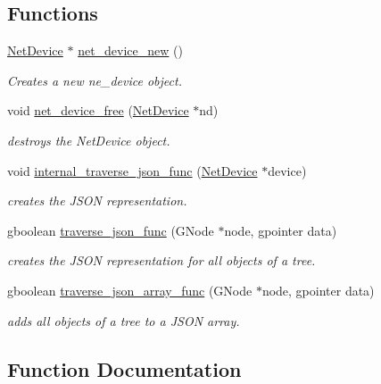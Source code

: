 \subsection*{Functions}
\begin{DoxyCompactItemize}
\item 
\hyperlink{gnode-object_8h_ab9c23d3a2ba4d9157b5ab053f61388dc}{Net\+Device} $\ast$ \hyperlink{gnode-object_8c_ae666b3f20895e60917e691c81d464235}{net\+\_\+device\+\_\+new} ()
\begin{DoxyCompactList}\small\item\em Creates a new ne\+\_\+device object. \end{DoxyCompactList}\item 
void \hyperlink{gnode-object_8c_af75477fcbe781bc0b17c75c1ad6d1606}{net\+\_\+device\+\_\+free} (\hyperlink{gnode-object_8h_ab9c23d3a2ba4d9157b5ab053f61388dc}{Net\+Device} $\ast$nd)
\begin{DoxyCompactList}\small\item\em destroys the Net\+Device object. \end{DoxyCompactList}\item 
void \hyperlink{gnode-object_8c_a37bf3d0e5222ef4eeda3b40df60a1812}{internal\+\_\+traverse\+\_\+json\+\_\+func} (\hyperlink{gnode-object_8h_ab9c23d3a2ba4d9157b5ab053f61388dc}{Net\+Device} $\ast$device)
\begin{DoxyCompactList}\small\item\em creates the J\+S\+ON representation. \end{DoxyCompactList}\item 
gboolean \hyperlink{gnode-object_8c_acde5d3e413f355d1b912f0dcb9d4cdc1}{traverse\+\_\+json\+\_\+func} (G\+Node $\ast$node, gpointer data)
\begin{DoxyCompactList}\small\item\em creates the J\+S\+ON representation for all objects of a tree. \end{DoxyCompactList}\item 
gboolean \hyperlink{gnode-object_8c_a0d906716c0b2c59e34bff01153dc23d2}{traverse\+\_\+json\+\_\+array\+\_\+func} (G\+Node $\ast$node, gpointer data)
\begin{DoxyCompactList}\small\item\em adds all objects of a tree to a J\+S\+ON array. \end{DoxyCompactList}\end{DoxyCompactItemize}


\subsection{Function Documentation}
\mbox{\label{gnode-object_8c_a37bf3d0e5222ef4eeda3b40df60a1812}} 
